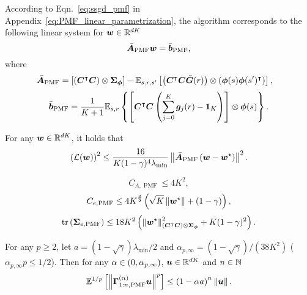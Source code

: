 According to Eqn.~\eqref{eq:ssgd_pmf} in Appendix~\ref{eq:PMF_linear_parametrization}, the algorithm corresponds to the following linear system for ${\bm{w}}\in{\mathbb R}^{dK}$
\begin{equation*}
     \bar{{\bm{A}}}_{\operatorname{PMF}}{\bm{w}}=\bar{{\bm{b}}}_{\operatorname{PMF}},
\end{equation*}
where
\begin{equation*}
\begin{aligned}
        \bar{{\bm{A}}}_{\operatorname{PMF}}&=\left[{\left({{\bm{C}}^{\intercal}{\bm{C}}}\right)\otimes{\bm{\Sigma}}_{{\bm{\phi}}}}\right]-{\mathbb E}_{s, r, s^\prime}\left[{\left({{\bm{C}}^{\intercal}{\bm{C}}\tilde{{\bm{G}}}(r)}\right)\otimes\left({{\bm{\phi}}(s){\bm{\phi}}(s^\prime)^{\intercal}}\right)}\right],
\end{aligned}
\end{equation*}
\begin{equation*}
    \bar{{\bm{b}}}_{\operatorname{PMF}}=\frac{1}{K+1}{\mathbb E}_{s, r}\left\{{\left[{{\bm{C}}^{\intercal}{\bm{C}}\left({\sum_{j=0}^K{\bm{g}}_j(r)-\bm{1}_K}\right)}\right]\otimes{\bm{\phi}}(s)}\right\}.
\end{equation*}
\begin{lemma}
For any ${\bm{w}}\in{\mathbb R}^{dK}$, it holds that
    \begin{equation*}
      \left({{\mathcal{L}}({\bm{w}})}\right)^2\leq\frac{16}{K(1-\gamma)^4\lambda_{\min}} \left\|{\bar{{\bm{A}}}_{\operatorname{PMF}}\left({{{\bm{w}}}-{\bm{w}}^{\star}}\right)}\right\|^2.
    \end{equation*}
\end{lemma}
\begin{lemma}
    \begin{equation*}
       C_{A,\operatorname{PMF}}\leq 4K^2,
    \end{equation*}
    \begin{equation*}
        C_{e,\operatorname{PMF}}\leq 4K^{\frac{3}{2}}\left({\sqrt{K}\left\|{{\bm{w}}^{\star}}\right\|+\left({1-\gamma}\right)}\right),
    \end{equation*}
    \begin{equation*}
        \operatorname{tr}\left({{\bm{\Sigma}}_{e,\operatorname{PMF}}}\right)\leq 18K^2\left({\left\|{{\bm{w}}^{\star}}\right\|_{\left({{\bm{C}}^{\intercal}{\bm{C}}}\right)\otimes{\bm{\Sigma}}_{{\bm{\phi}}}}^2+K(1-\gamma)^2}\right).
    \end{equation*}
\end{lemma}

\begin{lemma}
For any $p\geq 2$, let $a=(1-\sqrt\gamma)\lambda_{\min}/2$ and $\alpha_{p,\infty}=(1-\sqrt\gamma)/(38K^2)$ ($\alpha_{p,\infty}p\leq 1/2$).
Then for any $\alpha\in\left({0,\alpha_{p,\infty}}\right)$, ${\bm{u}}\in{\mathbb R}^{dK}$ and $n\in{\mathbb N}$
    \begin{equation*}
       {\mathbb E}^{1/p}\left[{\left\|{{\bm{\Gamma}}_{1:n,\operatorname{PMF}}^{(\alpha)}{\bm{u}}}\right\|^p}\right]\leq \left({1-\alpha a}\right)^n \left\|{{\bm{u}}}\right\|.
    \end{equation*}
\end{lemma}